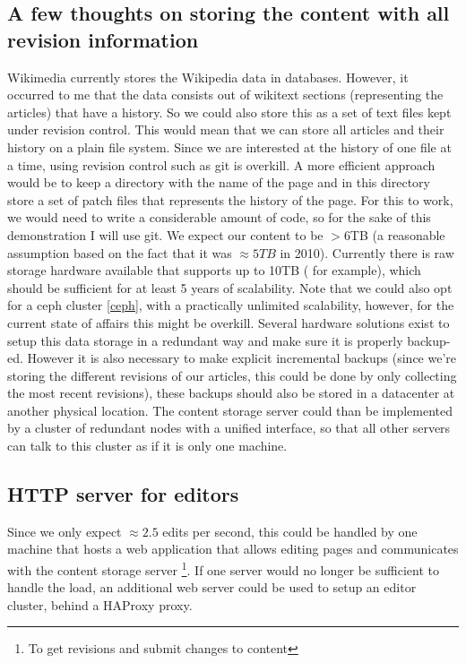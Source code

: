 \documentclass[12pt]{report}
\begin{document}
\subsection{A few thoughts on storing the content with all revision
  information}
Wikimedia currently stores the Wikipedia data in databases. However,
it occurred to me that the data consists out of wikitext sections
(representing the articles) that have a history. So we could also
store this as a set of text files kept under revision control.
This would mean that we can store all articles and their history on a
plain file system.
Since we are interested at the history of one file at a time, using 
revision control such as git is overkill. A more efficient
approach would be to keep a directory with the name of the page and in
this directory store a set of patch files that represents the history of the
page.
For this to work, we would need to write a considerable amount of code, so for the
sake of this demonstration I will use git.
We expect our content to be $>$6TB (a reasonable assumption based on
the fact that it was $\approx 5TB$ in 2010). Currently there is raw
storage hardware available that supports up to 10TB
(\cite{hp_10TB_storage} for example), which should be
sufficient for at least 5 years of scalability.
Note that we could also opt for a ceph cluster \cref{ceph}, with a
practically unlimited scalability, however, for the current state of
affairs this might be overkill.
Several hardware solutions exist to setup this data storage in a
redundant way and make sure it is properly backup-ed. However it is
also necessary to make explicit incremental backups (since
we're storing the different revisions of our articles, this could be
done by only collecting the most recent revisions), these backups
should also be stored in a datacenter at another physical location.
The content storage server could than be implemented by a cluster of
redundant nodes with a unified interface, so that all other servers
can talk to this cluster as if it is only one machine.

\subsection{HTTP server for editors}
Since we only expect $\approx 2.5$ edits per second, this could be
handled by one machine that hosts a web application that allows
editing pages and communicates with the content storage server \footnote{To get
revisions and submit changes to content}.
If one server would no longer be sufficient to handle the load, an
additional web server could be used to setup an editor cluster, behind
a HAProxy proxy.
\end{document}
